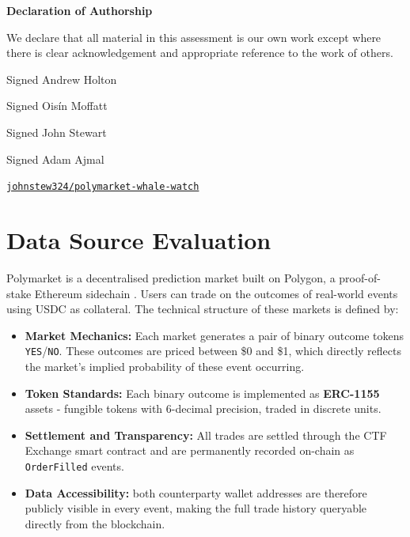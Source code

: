 \documentclass[11pt,a4paper]{article}
\begin{document}
\vspace{0.7cm}

{\bfseries Declaration of Authorship}

We declare that all material in this assessment is our own work except where there is clear acknowledgement and appropriate reference to the work of others.

\vspace{0.4cm}
Signed \dotfill Andrew Holton \dotfill

\vspace{0.3cm}
Signed \dotfill Ois\'{i}n Moffatt \dotfill

\vspace{0.3cm}
Signed \dotfill John Stewart \dotfill

\vspace{0.3cm}
Signed \dotfill Adam Ajmal \dotfill

\newpage

\begin{center}
\vspace{1.2em}
{\large \faGithub\;
\href{https://github.com/johnstew324/polymarket-whale-watch}{%
\texttt{johnstew324/polymarket-whale-watch}}}
\end{center}

\section{Data Source Evaluation}
\label{sec:data_sources}

Polymarket is a decentralised prediction market built on Polygon,
a proof-of-stake Ethereum sidechain \cite{polymarket_docs}. Users can
trade on the outcomes of real-world events using USDC as
collateral. The technical structure of these markets is defined by:

\begin{itemize}
    \item \textbf{Market Mechanics:} Each market generates a pair of binary outcome tokens \texttt{YES}/\texttt{NO}. These outcomes are priced between \$0 and \$1, which  directly reflects the market's implied probability of these event occurring.
    \item \textbf{Token Standards:} Each binary outcome is implemented as \textbf{ERC-1155} assets - fungible tokens with 6-decimal precision, traded in discrete units. 
    \item \textbf{Settlement and Transparency:} All trades are settled through the CTF Exchange smart contract and are permanently recorded on-chain as \texttt{OrderFilled} events.
    \item \textbf{Data Accessibility:} both counterparty wallet addresses are therefore
    publicly visible in every event, making the full trade history queryable directly from the blockchain.
\end{itemize}
\end{document}
